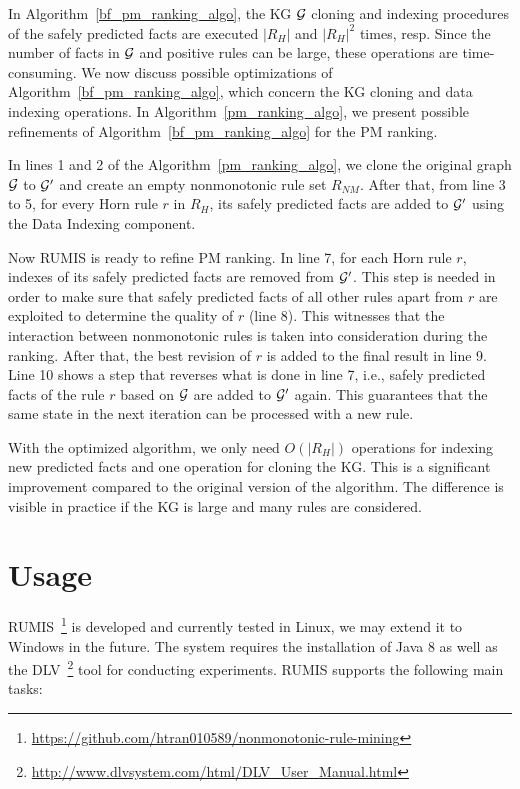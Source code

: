 In Algorithm~\ref{bf_pm_ranking_algo}, the KG $\mathcal{G}$ cloning and indexing procedures of the safely predicted facts are executed $|R_H|$ and $|R_H|^2$ times, resp. Since the number of facts in $\mathcal{G}$ and positive rules can be large, these operations are time-consuming. We now discuss possible optimizations of Algorithm~\ref{bf_pm_ranking_algo}, which concern the KG cloning and data indexing operations. In Algorithm~\ref{pm_ranking_algo}, we present possible refinements of Algorithm~\ref{bf_pm_ranking_algo} for the PM ranking.

In lines 1 and 2 of the Algorithm~\ref{pm_ranking_algo}, we clone the original graph $\mathcal{G}$ to $\mathcal{G}'$ and create an empty nonmonotonic rule set $R_{NM}$. After that, from line 3 to 5, for every Horn rule $r$ in $R_H$, its safely predicted facts are added to $\mathcal{G}'$ using the Data Indexing component.

Now RUMIS is ready to refine PM ranking. In line 7, for each Horn rule $r$, indexes of its safely predicted facts are removed from $\mathcal{G}'$. This step is needed in order to make sure that safely predicted facts of all other rules apart from $r$ are exploited to determine the quality of $r$ (line 8). This witnesses that the interaction between nonmonotonic rules is taken into consideration during the ranking. After that, the best revision of $r$ is added to the final result in line 9. Line 10 shows a step that reverses what is done in line 7, i.e., safely predicted facts of the rule $r$ based on $\mathcal{G}$ are added to $\mathcal{G}'$ again. This guarantees that the same state in the next iteration can be processed with a new rule.

With the optimized algorithm, we only need $O(|R_H|)$ operations for indexing new predicted facts and one operation for cloning the KG. This is a significant improvement compared to the original version of the algorithm. The difference is visible in practice if the KG is large and many rules are considered.

\section{Usage}

RUMIS~\footnote{\url{https://github.com/htran010589/nonmonotonic-rule-mining}} is developed and currently tested in Linux, we may extend it to Windows in the future. The system requires the installation of Java 8 as well as the DLV~\footnote{\url{http://www.dlvsystem.com/html/DLV_User_Manual.html}} tool for conducting experiments. RUMIS supports the following main tasks:

